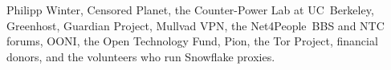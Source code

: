 \documentclass[letterpaper,twocolumn]{article}
\begin{document}
Philipp Winter, %
Censored Planet, %
the Counter-Power Lab at UC~Berkeley,
Greenhost, %
Guardian Project, %
Mullvad VPN, %
the Net4People~BBS and NTC forums, %
OONI, %
the Open Technology Fund, %
Pion,
the Tor Project,
financial donors,
and the volunteers who run Snowflake proxies.

{
\raggedright


}
\end{document}
